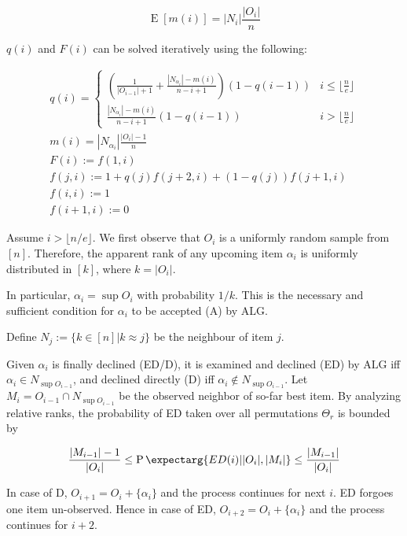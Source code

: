\documentclass{article}
\newcommand{\expec}{\operatorname{E}}
\newcommand{\card}[1]{\lvert #1 \rvert}
\newcommand{\prob}{\operatorname{P}\expectarg}
\begin{document}
\begin{equation*}
\expec[m(i)] = |N_i|\frac{|O_i|}{n}
\end{equation*}

$q(i)$ and $F(i)$ can be solved iteratively using the following:

\begin{gather*}
q(i)= \begin{cases}
\left(\frac{1}{|O_{i-1}|+1} + \frac{|N_{\alpha_i}|-m(i)}{n-i+1}\right)(1-q(i-1)) &i\leq\lfloor\frac{n}{e}\rfloor \\
\frac{|N_{\alpha_i}|-m(i)}{n-i+1}(1-q(i-1)) &i>\lfloor\frac{n}{e}\rfloor
\end{cases} \\
m(i) = |N_{\alpha_i}|\frac{|O_i|-1}{n} \\
F(i) := f(1,i)\\
f(j,i) := 1+q(j)f(j+2,i) + (1-q(j))f(j+1,i)\\
f(i,i) := 1\\
f(i+1,i) := 0
\end{gather*}

\newpage

\newcommand{\ALG}{\text{ALG}}

Assume $i > \lfloor n/e \rfloor $. We first observe that $O_i$ is a uniformly random sample from $[n]$. Therefore, the apparent rank of any upcoming item $\alpha_i$ is uniformly distributed in $[k]$, where $k = |O_i|$.

In particular, $\alpha_i = \sup O_i$ with probability $1/k$. This is the necessary and sufficient condition for $\alpha_i$ to be accepted (A) by $\ALG$.

Define $N_j := \{k\in[n] | k \approx j\}$ be the neighbour of item $j$.

Given $\alpha_i$ is finally declined (ED/D), it is examined and declined (ED) by $\ALG$ iff $\alpha_i \in N_{\sup O_{i-1}}$, and declined directly (D) iff $\alpha_i \not \in  N_{\sup O_{i-1}}$. Let $M_i = O_{i-1}\cap N_{\sup O_{i-1}}$ be the observed neighbor of so-far best item. By analyzing relative ranks, the probability of ED taken over all permutations $\Theta_r$ is bounded by

\begin{equation}\label{eq:ED given D bound}
\frac{|M_{i-1}|-1}{|O_{i}|} \leq
\prob{ED(i) | \card{O_i}, \card{M_i}} \leq
\frac{|M_{i-1}|}{|O_{i}|}
\end{equation}

In case of D, $O_{i+1} = O_i + \{\alpha_i\}$ and the process continues for next $i$. ED forgoes one item un-observed. Hence in case of ED, $O_{i+2} = O_i + \{\alpha_i\}$ and the process continues for $i+2$.
\end{document}
